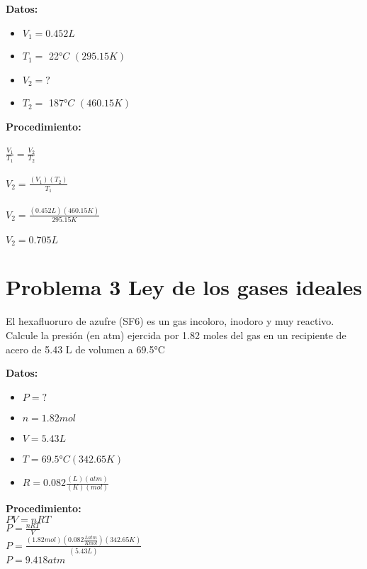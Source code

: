 \documentclass[12pt, letterpaper]{article}
\begin{document}
\begin{multicols}{2}

{\large \textbf{Datos:}}
\begin{itemize}
    \item $V_1 = 0.452 L$
    \item $T_1 =$ 22°$C$ $(295.15 K)$
    \item $V_2 = ?$
    \item $T_2 =$ 187°$C$ $(460.15 K)$
\end{itemize}
\columnbreak
{\large \textbf{Procedimiento:}}\\ \\

{\large
$\frac{V_1}{T_1} = \frac{V_2}{T_2}$}\\ \\

{\large $V_2 = \frac{(V_1)(T_2)}{T_1}$}\\ \\

{\large $V_2 = \frac{(0.452L)(460.15K)}{295.15K}$} \\ \\

\ul{\large $V_2 = 0. 705 L$}

\end{multicols}

\section{Problema 3 Ley de los gases ideales}
El hexafluoruro de azufre (SF6) es un gas incoloro, inodoro y muy reactivo. Calcule la presión (en
atm) ejercida por 1.82 moles del gas en un recipiente de acero de 5.43 L de volumen a 69.5°C\\

\begin{multicols}{2}
{\large \textbf{Datos:}}
\begin{itemize}
    \item $P = ?$
    \item $n = 1.82 mol$
    \item $V = 5.43 L$
    \item $T = 69.5°C (342.65K)$
    \item $R = 0.082 \frac{(L)(atm)}{(K)(mol)}$
\end{itemize}
\columnbreak

{\large \textbf{Procedimiento:}}\\

\large{$PV = n R T$}\\

\large{$P = \frac{nRT}{V}$}\\

\large{$P = \frac{(1.82mol)(0.082\frac{Latm}{Kmol})(342.65K)}{(5.43L)}$}\\

\ul{\large$P = 9.418 atm$}

\end{multicols}
\end{document}
